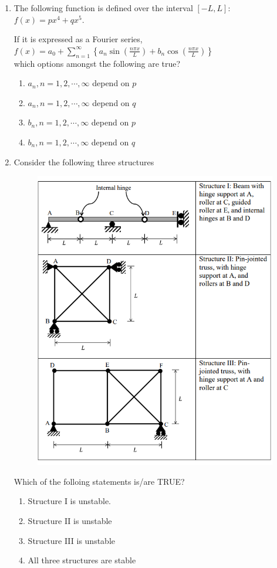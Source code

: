 \documentclass[journal,12pt,onecolumn]{IEEEtran}
\theoremstyle{remark}
\begin{document}
\begin{enumerate}
\item The following function is defined over the interval $[-L, L]$:\\
$f(x) = px^4 + qx^5.$

If it is expressed as a Fourier series,\\
$f(x) = a_0 + \sum_{n=1}^{\infty} \left\{ a_n \sin\left(\frac{n\pi x}{L}\right) + b_n \cos\left(\frac{n\pi x}{L}\right) \right\}$\\
which options amongst the following are true?

\hfill{}
\begin{enumerate}
\item $a_n, n=1,2,\cdots,\infty$ depend on $p$
\item $a_n, n=1,2,\cdots,\infty$ depend on $q$
\item $b_n, n=1,2,\cdots,\infty$ depend on $p$
\item $b_n, n=1,2,\cdots,\infty$ depend on $q$
\end{enumerate}

\item Consider the following three structures

\begin{figure}[H]
\centering
\includegraphics[width=0.5\linewidth]{figs/q26.png}
\caption*{}
\label{fig:Q.26}
\end{figure}

Which of the folloing statements is/are TRUE?

\hfill{}
\begin{enumerate}
\item Structure I is unstable.
\item Structure II is unstable
\item Structure III is unstable
\item All three structures are stable
\end{enumerate}


\end{enumerate}
\end{document}
